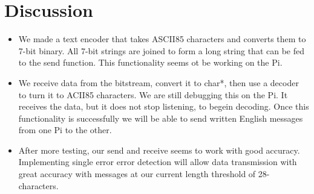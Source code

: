 \documentclass{article}
\begin{document}
\section*{Discussion}
\begin{itemize}
    \item We made a text encoder that takes ASCII85 characters and converts them to 7-bit binary. All 7-bit strings are joined to form
    a long string that can be fed to the send function. This functionality seems ot be working on the Pi.
    \item We receive data from the bitstream, convert it to char*, then use a decoder to turn it to ACII85 characters. We are still debugging
    this on the Pi. It receives the data, but it does not stop listening, to begein decoding. Once this functionality is successfully we will
    be able to send written English messages from one Pi to the other.
    \item After more testing, our send and receive seems to work with good accuracy. Implementing single error error detection will allow data transmission
    with great accuracy with messages at our current length threshold of 28- characters. 
\end{itemize}

\end{document}
